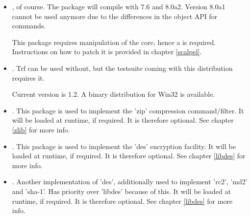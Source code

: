 \documentclass {report}
\begin{document}
\begin{itemize}
\item	\strong {\tcl}, of course. The package will compile with 7.6
	and 8.0a2. Version 8.0a1 cannot be used anymore due to the
	differences in the object API for commands.

	This package requires manipulation of the core, hence a
	 is required. Instructions on how
	to patch it is provided in chapter \ref {scalpel}.

\item	{}. Trf can be used without, but the
	testsuite coming with this distribution requires it.

	Current version is 1.2. A binary distribution for Win32 is
	available.


	
\item	\strong {\zlib}. This package is used to implement the 'zip'
	compression command/filter. It will be loaded at runtime, if
	required. It is therefore optional. See chapter \ref {zlib} for
	more info.

\item	{}. This package is used to implement the 'des'
	encryption facility. It will be loaded at runtime, if
	required. It is therefore optional. See chapter \ref {libdes}
	for more info.

\item	\strong {\SSLeay}. Another implementation of 'des',
	additionally used to implement 'rc2', 'md2' and 'sha-1'. Has
	priority over 'libdes' because of this. It will be loaded at
	runtime, if required. It is therefore optional. See chapter
	\ref {libdes} for more info.
\end{itemize}
\end{document}
